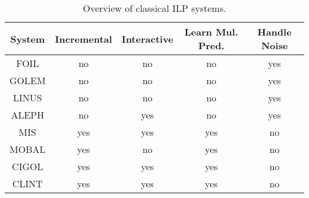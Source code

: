 \begin{table}[t]
\centering
\begin{tabular}{|c|c|c|c|c|}
\hline
System & Incremental & Interactive & Learn Mul. Pred. & Handle Noise\\
\hline
FOIL \cite{foil} & no & no & no & yes \\
GOLEM \cite{golem} & no & no & no & yes \\
LINUS \cite{linus} & no & no & no & yes \\
ALEPH \cite{aleph} & no & yes & no & yes \\
MIS \cite{mis} & yes & yes & yes & no \\
MOBAL \cite{mobal} & yes & no & yes & no \\
CIGOL \cite{cigol} & yes & yes & yes & no \\
CLINT \cite{clint} & yes & yes & yes & no \\
\hline
\end{tabular}
\caption{Overview of classical ILP systems.}
\label{tab:ilp}
\end{table}